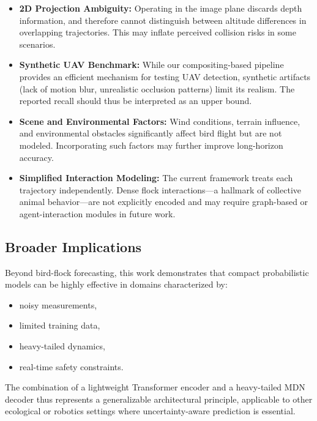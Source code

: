 \documentclass[journal]{IEEEtran}
\begin{document}
\begin{itemize}
	\item \textbf{2D Projection Ambiguity:} Operating in the image plane discards depth information, and therefore cannot distinguish between altitude differences in overlapping trajectories. This may inflate perceived collision risks in some scenarios.
	
	\item \textbf{Synthetic UAV Benchmark:} While our compositing-based pipeline provides an efficient mechanism for testing UAV detection, synthetic artifacts (lack of motion blur, unrealistic occlusion patterns) limit its realism. The reported recall should thus be interpreted as an upper bound.
	
	\item \textbf{Scene and Environmental Factors:} Wind conditions, terrain influence, and environmental obstacles significantly affect bird flight but are not modeled. Incorporating such factors may further improve long-horizon accuracy.
	
	\item \textbf{Simplified Interaction Modeling:} The current framework treats each trajectory independently. Dense flock interactions—a hallmark of collective animal behavior—are not explicitly encoded and may require graph-based or agent-interaction modules in future work.
\end{itemize}

\subsection{Broader Implications}

Beyond bird-flock forecasting, this work demonstrates that compact probabilistic models can be highly effective in domains characterized by:
\begin{itemize}
	\item noisy measurements,
	\item limited training data,
	\item heavy-tailed dynamics,
	\item real-time safety constraints.
\end{itemize}

The combination of a lightweight Transformer encoder and a heavy-tailed MDN decoder thus represents a generalizable architectural principle, applicable to other ecological or robotics settings where uncertainty-aware prediction is essential.
\end{document}
